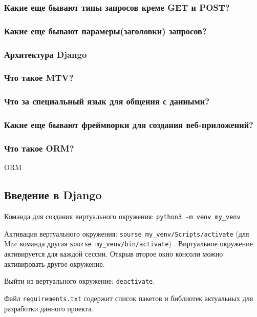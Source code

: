 \documentclass[%
	11pt,
	a4paper,
	utf8,
		]{article}
\begin{document}
\subsubsection{Какие еще бывают типы запросов креме GET и POST?}

\subsubsection{Какие еще бывают парамеры(заголовки) запросов?}

\subsubsection{Архитектура Django}

\subsubsection{Что такое MTV?}

\subsubsection{Что за специальный язык для общения с данными?}

\subsubsection{Какие еще бывают фреймворки для создания веб-приложений?}

\subsubsection{Что такое ORM?}

ORM


\subsection{Введение в Django}

Команда для создания виртуального окружения: \verb|python3 -m venv my_venv|

Активация вертуального окружения: \verb|sourse my_venv/Scripts/activate| (для Mac команда другая  \lstinline{sourse my_venv/bin/activate}) . Виртуальное окружение активируется для каждой сессии. Открыв второе окно консоли можно активировать другое окружение.

Выйти из вертуального окружение: \texttt{deactivate}.

Файл \texttt{requirements.txt} содержит список пакетов и библиотек актуальных для разработки данного проекта. 
\end{document}
